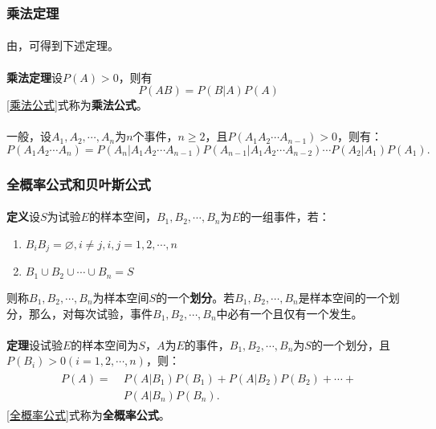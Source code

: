 \subsubsection{乘法定理}
\paragraph{}
由，可得到下述定理。
\paragraph{}
\textbf{乘法定理\;}设$P(A)>0$，则有
\begin{equation}
  \label{乘法公式}
  P(AB) = P(B|A)P(A)
\end{equation}
\eqref{乘法公式}式称为\textbf{乘法公式}。
\paragraph{}
一般，设$A_1, A_2, \cdots, A_n$为$n$个事件，$n \geq 2$，且$P(A_1A_2\cdots A_{n-1}) > 0$，则有：
\begin{equation}
  P(A_1A_2\cdots A_n) = P(A_n|A_1A_2\cdots A_{n-1})P(A_{n-1}|A_1A_2\cdots A_{n-2})\cdots P(A_2|A_1)P(A_1).
\end{equation}

\subsubsection{全概率公式和贝叶斯公式}
\paragraph{}
\textbf{定义\;}设$S$为试验$E$的样本空间，$B_1, B_2, \cdots, B_n$为$E$的一组事件，若：
\begin{enumerate}
  \item $B_iB_j=\varnothing, i \neq j, i,j = 1,2,\cdots,n$
  \item $B_1 \cup B_2 \cup \cdots \cup B_n = S$
\end{enumerate}
则称$B_1,B_2,\cdots,B_n$为样本空间$S$的一个\textbf{划分}。若$B_1,B_2,\cdots,B_n$是样本空间的一个划分，那么，对每次试验，事件$B_1,B_2,\cdots,B_n$中必有一个且仅有一个发生。

\paragraph{}
\textbf{定理\;}设试验$E$的样本空间为$S$，$A$为$E$的事件，$B_1,B_2,\cdots,B_n$为$S$的一个划分，且$P(B_i)>0(i=1,2,\cdots,n)$，则：
\begin{align}
  \label{全概率公式}
  \begin{split}
    P(A) =&\; P(A|B_1)P(B_1) + P(A|B_2)P(B_2)+ \cdots + \\
    &\; P(A|B_n)P(B_n).
  \end{split}
\end{align}
\eqref{全概率公式}式称为\textbf{全概率公式}。

